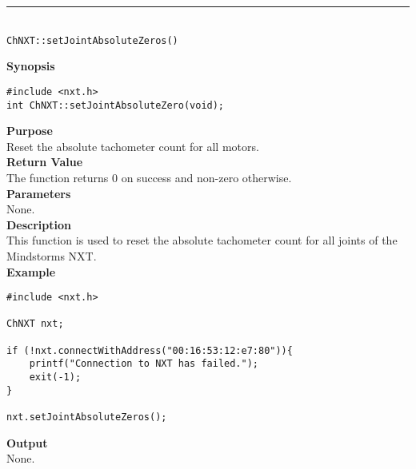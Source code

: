 \noindent
\vspace{5pt}
\rule{4.5in}{0.015in}\\
\noindent
{\LARGE \texttt{ChNXT::setJointAbsoluteZeros()} }\\


\noindent
{\bf Synopsis}
\vspace{-8pt}
\begin{verbatim}
#include <nxt.h>
int ChNXT::setJointAbsoluteZero(void);
\end{verbatim}

\noindent
{\bf Purpose}\\
Reset the absolute tachometer count for all motors.\\

\noindent
{\bf Return Value}\\
The function returns 0 on success and non-zero otherwise.\\

\noindent
{\bf Parameters}\\
None.\\

\noindent
{\bf Description}\\
This function is used to reset the absolute tachometer count for 
all joints of the Mindstorms NXT.\\

\noindent
{\bf Example}
\begin{verbatim}
#include <nxt.h> 

ChNXT nxt;

if (!nxt.connectWithAddress("00:16:53:12:e7:80")){
    printf("Connection to NXT has failed.");
    exit(-1);
}
    
nxt.setJointAbsoluteZeros();
\end{verbatim}

\noindent
{\bf Output}\\
None.\\
\\

